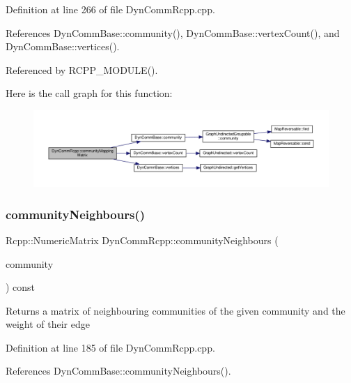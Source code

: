 Definition at line 266 of file Dyn\+Comm\+Rcpp.\+cpp.



References Dyn\+Comm\+Base\+::community(), Dyn\+Comm\+Base\+::vertex\+Count(), and Dyn\+Comm\+Base\+::vertices().



Referenced by R\+C\+P\+P\+\_\+\+M\+O\+D\+U\+L\+E().

Here is the call graph for this function\+:
\nopagebreak
\begin{figure}[H]
\begin{center}
\leavevmode
\includegraphics[width=350pt]{classDynCommRcpp_aaa996ab5e558887d3bc5394af78a2e95_cgraph}
\end{center}
\end{figure}
\mbox{\label{classDynCommRcpp_ad23168e5fa7cf85d5508c646f3e39b9b}} 
\subsubsection{\texorpdfstring{community\+Neighbours()}{communityNeighbours()}}
{\footnotesize\ttfamily Rcpp\+::\+Numeric\+Matrix Dyn\+Comm\+Rcpp\+::community\+Neighbours (\begin{DoxyParamCaption}\item[{\hyperlink{graphUndirectedGroupable_8h_a914da95c9ea7f14f4b7f875c36818556}{type\+Community}}]{community }\end{DoxyParamCaption}) const\hspace{0.3cm}{\ttfamily [inline]}}

\begin{DoxyReturn}{Returns}
a matrix of neighbouring communities of the given community and the weight of their edge 
\end{DoxyReturn}


Definition at line 185 of file Dyn\+Comm\+Rcpp.\+cpp.



References Dyn\+Comm\+Base\+::community\+Neighbours().



